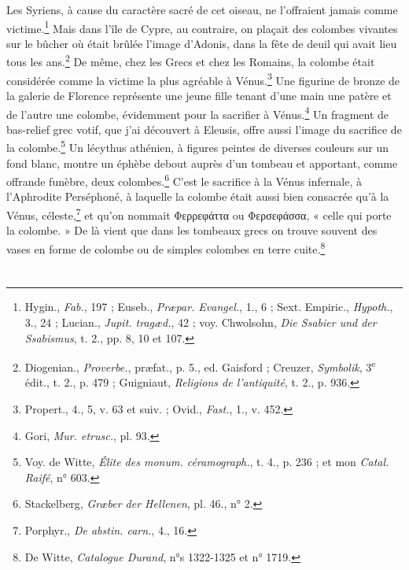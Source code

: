 \documentclass[a4paper, 11pt, oneside, landscape]{article}
\begin{document}
Les Syriens, à cause du caractère sacré de cet oiseau, ne l'offraient jamais comme victime.\footnote{Hygin., \emph{Fab.}, 197 ; Euseb., \emph{Præpar. Evangel.}, 1., 6 ; Sext. Empiric., \emph{Hypoth.}, 3., 24 ; Lucian., \emph{Jupit. tragæd.}, 42 ; voy. Chwolsohn, \emph{Die Ssabier und der Ssabismus}, t. 2., pp. 8, 10 et 107.} Mais dans l'île de Cypre, au contraire, on plaçait des colombes vivantes sur le bûcher où était brûlée l'image d'Adonis, dans la fête de deuil qui avait lieu tous les ans.\footnote{Diogenian., \emph{Proverbe.}, præfat., p. 5., ed. Gaisford ; Creuzer, \emph{Symbolik}, 3\textsuperscript{e} édit., t. 2., p. 479 ; Guigniaut, \emph{Religions de l'antiquité}, t. 2., p. 936.} De même, chez les Grecs et chez les Romains, la colombe était considérée comme la victime la plus agréable à Vénus.\footnote{Propert., 4., 5, v. 63 et suiv. ; Ovid., \emph{Fast.}, 1., v. 452.} Une figurine de bronze de la galerie de Florence représente une jeune fille tenant d'une main une patère et de l'autre une colombe, évidemment pour la sacrifier à Vénus.\footnote{Gori, \emph{Mur. etrusc.}, pl. 93.} Un fragment de bas-relief grec votif, que j'ai découvert à Eleusis, offre aussi l'image du sacrifice de la colombe.\footnote{Voy. de Witte, \emph{Élite des monum. céramograph.}, t. 4., p. 236 ; et mon \emph{Catal. Raifé}, n° 603.} Un lécythus athénien, à figures peintes de diverses couleurs sur un fond blanc, montre un éphèbe debout auprès d'un tombeau et apportant, comme offrande funèbre, deux colombes.\footnote{Stackelberg, \emph{Græber der Hellenen}, pl. 46., n° 2.} C'est le sacrifice à la Vénus infernale, à l'Aphrodite Perséphoné, à laquelle la colombe était aussi bien consacrée qu'à la Vénus, céleste,\footnote{Porphyr., \emph{De abstin. carn.}, 4., 16.} et qu'on nommait Φερρεφάττα ou Φερσεφάσσα, « celle qui porte la colombe. » De là vient que dans les tombeaux grecs on trouve souvent des vases en forme de colombe ou de simples colombes en terre cuite.\footnote{De Witte, \emph{Catalogue Durand}, n°s 1322-1325 et n° 1719.} 

\bigskip \centerline{\EightStarTaper} \centerline{\EightStarTaper\EightStarTaper} \bigskip\clearpage
\section{}
\end{document}
